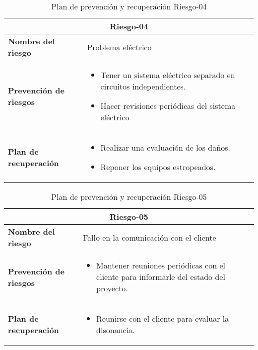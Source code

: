 \begin{table}[H]
\begin{center}
\begin{tabular}{p{} p{10cm}}
\multicolumn{2}{c}{\textbf{Riesgo-04} } \\
\hline \hline
\textbf{Nombre del riesgo} & Problema eléctrico \\
\hline
\textbf{Prevención de riesgos} & \begin{itemize}[-]
  \item Tener un sistema eléctrico separado en circuitos independientes.
  \item Hacer revisiones periódicas del sistema eléctrico
  \end{itemize} \\
\hline
\textbf{Plan de recuperación} &   \begin{itemize}[-]
  \item Realizar una evaluación de los daños.
  \item Reponer los equipos estropeados.
  \end{itemize}\\
\hline
\end{tabular}
\caption{Plan de prevención y recuperación Riesgo-04}
\label{tab:Riesgo-04-Prev_Recup}
\end{center}
\end{table}

\begin{table}[H]
\begin{center}
\begin{tabular}{p{} p{10cm}}
\multicolumn{2}{c}{\textbf{Riesgo-05} } \\
\hline \hline
\textbf{Nombre del riesgo} & Fallo en la comunicación con el cliente \\
\hline
\textbf{Prevención de riesgos} & \begin{itemize}[-]
  \item Mantener reuniones periódicas con el cliente para informarle del estado del proyecto.
  \end{itemize} \\
\hline
\textbf{Plan de recuperación} &   \begin{itemize}[-]
  \item Reunirse con el cliente para evaluar la disonancia.
  \end{itemize}\\
\hline
\end{tabular}
\caption{Plan de prevención y recuperación Riesgo-05}
\label{tab:Riesgo-05-Prev_Recup}
\end{center}
\end{table}

